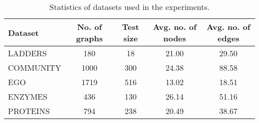 \begin{table}[h!]
    \footnotesize
    \centering
    \caption{Statistics of datasets used in the experiments.}
    \label{tab:generation-datasets}
    \begin{tabular}{lcccc}
        \toprule
         \textbf{Dataset} & \textbf{No. of graphs} & \textbf{Test size} & \textbf{Avg. no. of nodes} & \textbf{Avg. no. of edges}\\
         \midrule
         LADDERS & 180 & 18 & 21.00 & 29.50 \\
         COMMUNITY & 1000 & 300 & 24.38 & 88.58 \\
         EGO & 1719 & 516 & 13.02 & 18.51 \\
         ENZYMES & 436 & 130 & 26.14 & 51.16 \\
         PROTEINS & 794 & 238 & 20.49 & 38.67 \\
        \bottomrule
    \end{tabular}
\end{table}
